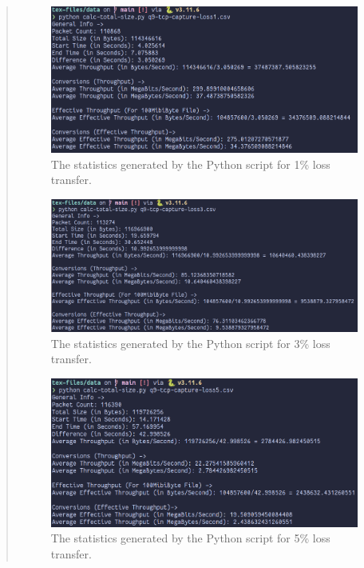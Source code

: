 \documentclass{article}
\newenvironment{ans}
{\fbox{Answer}\begin{quote}\nopagebreak}
{\end{quote}}
\begin{document}
\begin{ans}
\begin{figure}[H]
\centering
\includegraphics[width=16cm]{data/q9-stats-tcp-loss1.png}
\caption{The statistics generated by the Python script for 1\% loss transfer.}
\end{figure}

\begin{figure}[H]
\centering
\includegraphics[width=16cm]{data/q9-stats-tcp-loss3.png}
\caption{The statistics generated by the Python script for 3\% loss transfer.}
\end{figure}

\begin{figure}[H]
\centering
\includegraphics[width=16cm]{data/q9-stats-tcp-loss5.png}
\caption{The statistics generated by the Python script for 5\% loss transfer.}
\end{figure}


\end{ans}
\end{document}
